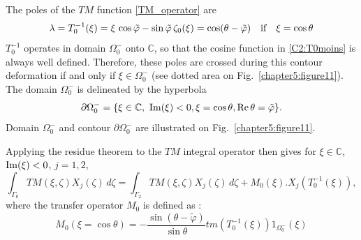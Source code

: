 The poles of the $TM$ function \eqref{TM_operator} are
\begin{equation}
\lambda = T_0^{-1}(\xi) = \xi \, \cos \tilde{\varphi}  - \sin \tilde{\varphi} \, \zeta_0(\xi) = \cos (\theta - \tilde{\varphi}) \quad \text{if} \quad \xi = \cos \theta
\label{C2:T0moins}
\end{equation}
$T_0^{-1}$ operates in domain $\Omega_0^-$ onto $\mathbb{C}$, so that the cosine function in \eqref{C2:T0moins} is always well defined. Therefore, these poles are crossed during this contour deformation if and only if $\xi \in \Omega_0^-$ (see dotted area on Fig.~\ref{chapter5:figure11}).
The domain $\Omega_0^-$ is delineated by the hyperbola 
\begin{equation}
\partial \Omega_0^- = \{   \xi \in \mathbb{C}, \ {\rm Im}(\xi) <0,  \xi = \cos \theta, {\rm Re} \, \theta = \tilde{\varphi} \}.
\end{equation}
Domain $\Omega_0^-$ and contour $\partial \Omega_0^-$ are illustrated on Fig.~\ref{chapter5:figure11}.   

Applying the residue theorem to the $TM$ integral operator then gives for $\xi \in \mathbb{C}$, ${\rm Im}(\xi) <0$, $j=1,2$,
\begin{equation}
\label{TM_propag_sol}
\int_{\Gamma_0} TM(\xi,\zeta)X_j(\zeta)\, d\zeta = \int_{\Gamma_2}  TM(\xi,\zeta)X_j(\zeta)\, d\zeta+M_0(\xi).X_j(T^{-1}_0(\xi)),
\end{equation}
where the transfer operator $M_0$ is defined as :
\begin{equation}
\label{defM0}
M_0(\xi=\cos\theta)=-\frac{\sin(\theta-\tilde{\varphi})}{\sin\theta} tm(T_0^{-1}(\xi))1_{\Omega_0^-}(\xi)
\end{equation}

